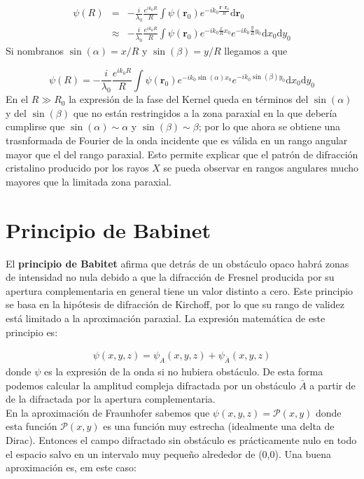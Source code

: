 \documentclass[12pt,a4paper]{book}
\numberwithin{equation}{section}
\numberwithin{figure}{section}
\newcommand{\D}{\mathrm{d}}
\newcommand{\1}{_{(1)}}
\newcommand{\2}{_{(2)}}
\newcommand{\rn}{\mathbf{r}}
\theoremstyle{definition}
\begin{document}
\begin{eqnarray}
    \psi (R) &  = &  - \frac{i}{\lambda_0} \frac{e^{ik_0R}}{R} \int \psi(\rn_0) e^{-ik_0\frac{\rn \cdot \rn_0}{R}} \D \rn_0  \\ & \approx &  - \frac{i}{\lambda_0} \frac{e^{ik_0R}}{R} \int \psi (\rn_0) e^{-ik_0\frac{x}{R}x_0}e^{-ik_0\frac{y}{R}y_0} \D x_0 \D y_0
\end{eqnarray}
Si nombranos $\sin(\alpha) = x/R$ y $\sin(\beta)=y/R$ llegamos a que

\begin{equation}
    \psi (R) = - \frac{i}{\lambda_0} \frac{e^{ik_0R}}{R} \int \psi (\rn_0) e^{-ik_0\sin(\alpha) x_0}e^{-ik_0\sin(\beta) y_0} \D x_0 \D y_0
\end{equation}
En el $R\gg R_0$ la expresión de la fase del Kernel queda en términos del $\sin(\alpha)$ y del $\sin (\beta)$ que no están restringidos a la zona paraxial en la que debería cumplirse que $\sin(\alpha)\sim \alpha$ y $\sin(\beta)\sim \beta$; por lo que ahora se obtiene una trasnformada de Fourier de la onda incidente que es válida en un rango angular mayor que el del rango paraxial. Esto permite explicar que el patrón de difracción cristalino producido por los rayos $X$ se pueda observar en rangos angulares mucho mayores que la limitada zona paraxial.  

\section{Principio de Babinet}

El \textbf{principio de Babitet} afirma que detrás de un obstáculo opaco habrá zonas de intensidad no nula debido a que la difracción de Fresnel producida por su apertura complementaria en general tiene un valor distinto a cero. Este principio se basa en la hipótesis de difracción de Kirchoff, por lo que su rango de validez está limitado a la aproximación paraxial. La expresión matemática de este principio es:

\begin{eqnarray}
    \psi (x,y,z) = \psi_A(x,y,z)+\psi_{\bar{A}} (x,y,z) 
\end{eqnarray}
donde $\psi$ es la expresión de la onda si no hubiera obstáculo. De esta forma podemos calcular la amplitud compleja difractada por un obstáculo $\bar{A}$ a partir de de la difractada por la apertura complementaria. \\

En la aproximación de Fraunhofer sabemos que $\psi(x,y,z) = \mathcal{P}(x,y)$ donde esta función $\mathcal{P}(x,y)$ es una función muy estrecha (idealmente una delta de Dirac). Entonces el campo difractado sin obstáculo es prácticamente nulo en todo el espacio salvo en un intervalo muy pequeño alrededor de (0,0). Una buena aproximación es, em este caso:
\end{document}
